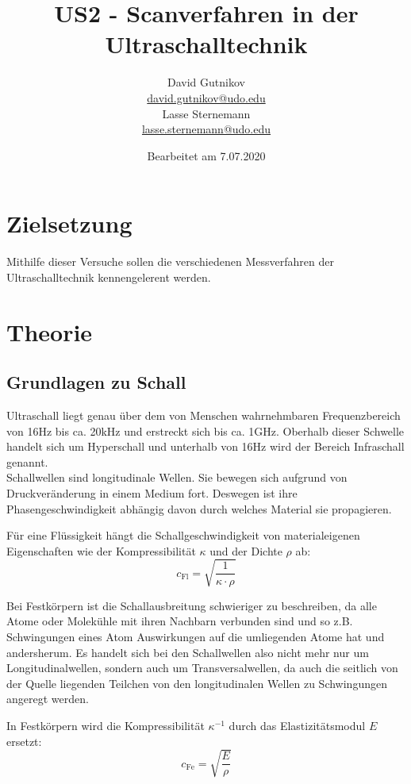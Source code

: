\documentclass[titlepage = firstcover]{scrartcl}
\title{US2 - Scanverfahren in der Ultraschalltechnik}
\author{
  David Gutnikov\\
  \href{mailto:david.gutnikov@udo.edu}{david.gutnikov@udo.edu}\\
  Lasse Sternemann\\
  \href{mailto:lasse.sternemann@udo.edu}{lasse.sternemann@udo.edu}
}
\date{Bearbeitet am 7.07.2020}
\begin{document}
    \maketitle
    \newpage
    \tableofcontents
    \newpage

    \section{Zielsetzung}
      Mithilfe dieser Versuche sollen die verschiedenen Messverfahren der Ultraschalltechnik kennengelerent werden.

    \section{Theorie}
      \subsection{Grundlagen zu Schall}
        Ultraschall liegt genau über dem von Menschen wahrnehmbaren Frequenzbereich von 16Hz bis ca. 20kHz und erstreckt sich bis ca. 1GHz. Oberhalb dieser Schwelle handelt sich um Hyperschall und unterhalb von 16Hz wird der Bereich Infraschall genannt. \\

        Schallwellen sind longitudinale Wellen. Sie bewegen sich aufgrund von Druckveränderung in einem Medium fort. Deswegen ist ihre Phasengeschwindigkeit abhängig davon durch welches Material sie propagieren.

        Für eine Flüssigkeit hängt die Schallgeschwindigkeit von materialeigenen Eigenschaften wie der Kompressibilität $\kappa$ und der Dichte $\rho$ ab:
        \begin{equation*}
          c_{\text{Fl}} = \sqrt{\frac{1}{\kappa \cdot \rho}}
        \end{equation*}

        Bei Festkörpern ist die Schallausbreitung schwieriger zu beschreiben, da alle Atome oder Molekühle mit ihren Nachbarn verbunden sind und so z.B. Schwingungen eines Atom Auswirkungen auf die umliegenden Atome hat und andersherum.
        Es handelt sich bei den Schallwellen also nicht mehr nur um Longitudinalwellen, sondern auch um Transversalwellen, da auch die seitlich von der Quelle liegenden Teilchen von den longitudinalen Wellen zu Schwingungen angeregt werden.

        In Festkörpern wird die Kompressibilität $\kappa^{-1}$ durch das Elastizitätsmodul $E$ ersetzt:
        \begin{equation*}
          c_{\text{Fe}} = \sqrt{\frac{E}{\rho}}
        \end{equation*}
\end{document}
